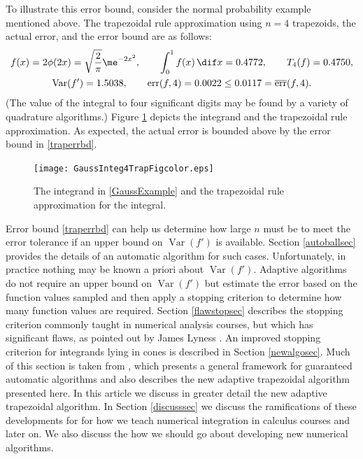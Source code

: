 \documentclass[]{article}
\DeclareMathOperator{\Var}{Var}
\DeclareMathOperator{\err}{err}
\newcommand{\oerr}{\overline{\err}}
\theoremstyle{definition}
\theoremstyle{remark}
\begin{document}
To illustrate this error bound, consider the normal probability example mentioned above.  The trapezoidal rule approximation using $n=4$ trapezoids, the actual error, and the error bound are as follows:
\begin{subequations} \label{GaussExample}
\begin{gather}
f(x) = 2\phi(2x) = \sqrt{\frac{2}{\pi}} \me^{-2x^2}, \qquad \int_0^1 f(x)  \, \dif x = 0.4772, \qquad T_{4}(f)= 0.4750, \\
\Var(f') = 1.5038, \qquad \err(f,4)=0.0022 \le 0.0117 = \oerr(f,4).
\end{gather}
\end{subequations}
(The value of the integral to four significant digits may be found by a variety of quadrature algorithms.)  Figure \ref{Gausstrapfig} depicts the integrand and the trapezoidal rule approximation. As expected, the actual error is bounded above by the error bound in \eqref{traperrbd}.

\begin{figure}
\centering 
\texttt{[image: GaussInteg4TrapFigcolor.eps]}
\caption{The integrand in \eqref{GaussExample} and the trapezoidal rule approximation for the integral. \label{Gausstrapfig}}
\end{figure}

Error bound \eqref{traperrbd} can help us determine how large $n$ must be to meet the error tolerance if an upper bound on $\Var(f')$ is available. Section \ref{autoballsec} provides the details of an automatic algorithm for such cases.  Unfortunately, in practice nothing may be known a priori about $\Var(f')$. Adaptive algorithms do not require an upper bound on $\Var(f')$ but estimate the error based on the function values sampled and then apply a stopping criterion to determine how many function values are required.  Section \ref{flawstopsec} describes the stopping criterion commonly taught in numerical analysis courses, but which has significant flaws, as pointed out by James Lyness .  An improved stopping criterion for integrands lying in cones is described in Section \ref{newalgosec}.  Much of this section is taken from , which presents a general framework for guaranteed automatic algorithms and also describes the new adaptive trapezoidal algorithm presented here.  In this article we discuss in greater detail the new adaptive trapezoidal algorithm.  In Section \ref{discusssec} we discuss the ramifications of these developments for for how we teach numerical integration in calculus courses and later on.  We also discuss the how we should go about developing new numerical algorithms.
\end{document}
